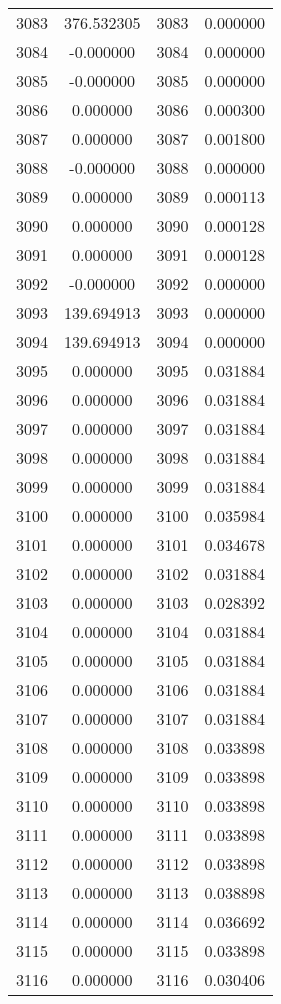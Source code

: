 \documentclass[12pt]{article}
\begin{document}
\begin{longtable}{@{}cccc@{}}
3083 & 376.532305 & 3083 & 0.000000 \\
3084 & -0.000000 & 3084 & 0.000000 \\
3085 & -0.000000 & 3085 & 0.000000 \\
3086 & 0.000000 & 3086 & 0.000300 \\
3087 & 0.000000 & 3087 & 0.001800 \\
3088 & -0.000000 & 3088 & 0.000000 \\
3089 & 0.000000 & 3089 & 0.000113 \\
3090 & 0.000000 & 3090 & 0.000128 \\
3091 & 0.000000 & 3091 & 0.000128 \\
3092 & -0.000000 & 3092 & 0.000000 \\
3093 & 139.694913 & 3093 & 0.000000 \\
3094 & 139.694913 & 3094 & 0.000000 \\
3095 & 0.000000 & 3095 & 0.031884 \\
3096 & 0.000000 & 3096 & 0.031884 \\
3097 & 0.000000 & 3097 & 0.031884 \\
3098 & 0.000000 & 3098 & 0.031884 \\
3099 & 0.000000 & 3099 & 0.031884 \\
3100 & 0.000000 & 3100 & 0.035984 \\
3101 & 0.000000 & 3101 & 0.034678 \\
3102 & 0.000000 & 3102 & 0.031884 \\
3103 & 0.000000 & 3103 & 0.028392 \\
3104 & 0.000000 & 3104 & 0.031884 \\
3105 & 0.000000 & 3105 & 0.031884 \\
3106 & 0.000000 & 3106 & 0.031884 \\
3107 & 0.000000 & 3107 & 0.031884 \\
3108 & 0.000000 & 3108 & 0.033898 \\
3109 & 0.000000 & 3109 & 0.033898 \\
3110 & 0.000000 & 3110 & 0.033898 \\
3111 & 0.000000 & 3111 & 0.033898 \\
3112 & 0.000000 & 3112 & 0.033898 \\
3113 & 0.000000 & 3113 & 0.038898 \\
3114 & 0.000000 & 3114 & 0.036692 \\
3115 & 0.000000 & 3115 & 0.033898 \\
3116 & 0.000000 & 3116 & 0.030406 \\

\end{longtable}
\end{document}
